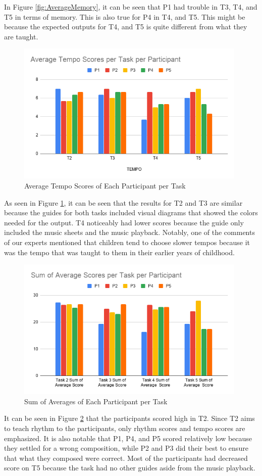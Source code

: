 In Figure \ref{fig:AverageMemory}, it can be seen that P1 had trouble in T3, T4, and T5 in terms of memory. This is also true for P4 in T4, and T5. This might be because the expected outputs for T4, and T5 is quite different from what they are taught. 

\begin{figure}[H]
    \centering
    \includegraphics[width=11cm]{figures/Results/AverageTempo.png}
    \caption{Average Tempo Scores of Each Participant per Task}
    \label{fig:AverageTempo}
\end{figure}

As seen in Figure \ref{fig:AverageTempo}, it can be seen that the results for T2 and T3 are similar because the guides for both tasks included visual diagrams that showed the colors needed for the output. T4 noticeably had lower scores because the guide only included the music sheets and the music playback. Notably, one of the comments of our experts mentioned that children tend to choose slower tempos because it was the tempo that was taught to them in their earlier years of childhood.

\begin{figure}[H]
    \centering
    \includegraphics[width=11cm]{figures/Results/SumOfTotalAverage.png}
    \caption{Sum of Averages of Each Participant per Task}
    \label{fig:SumOfTotalAverage}
\end{figure}

It can be seen in Figure \ref{fig:SumOfTotalAverage} that the participants scored high in T2. Since T2 aims to teach rhythm to the participants, only rhythm scores and tempo scores are emphasized. It is also notable that P1, P4, and P5 scored relatively low because they settled for a wrong composition, while P2 and P3 did their best to ensure that what they composed were correct. Most of the participants had decreased score on T5 because the task had no other guides aside from the music playback.
